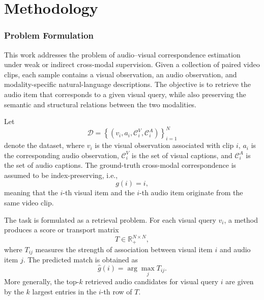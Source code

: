 
\chapter{Methodology}
\label{sec:methodology}

\subsection{Problem Formulation}
\label{subsec:problem_formulation}

This work addresses the problem of audio--visual correspondence estimation under weak or indirect cross-modal supervision. Given a collection of paired video clips, each sample contains a visual observation, an audio observation, and modality-specific natural-language descriptions. The objective is to retrieve the audio item that corresponds to a given visual query, while also preserving the semantic and structural relations between the two modalities.

Let
\begin{equation}
    \mathcal{D}
    =
    \left\{
    \left(v_i, a_i, \mathcal{C}^{V}_i, \mathcal{C}^{A}_i\right)
    \right\}_{i=1}^{N}
\end{equation}
denote the dataset, where $v_i$ is the visual observation associated with clip $i$, $a_i$ is the corresponding audio observation, $\mathcal{C}^{V}_i$ is the set of visual captions, and $\mathcal{C}^{A}_i$ is the set of audio captions. The ground-truth cross-modal correspondence is assumed to be index-preserving, i.e.,
\begin{equation}
    g(i) = i,
\end{equation}
meaning that the $i$-th visual item and the $i$-th audio item originate from the same video clip.

The task is formulated as a retrieval problem. For each visual query $v_i$, a method produces a score or transport matrix
\begin{equation}
    T \in \mathbb{R}_{+}^{N \times N},
\end{equation}
where $T_{ij}$ measures the strength of association between visual item $i$ and audio item $j$. The predicted match is obtained as
\begin{equation}
    \hat{g}(i) = \arg\max_{j} T_{ij}.
\end{equation}
More generally, the top-$k$ retrieved audio candidates for visual query $i$ are given by the $k$ largest entries in the $i$-th row of $T$.

